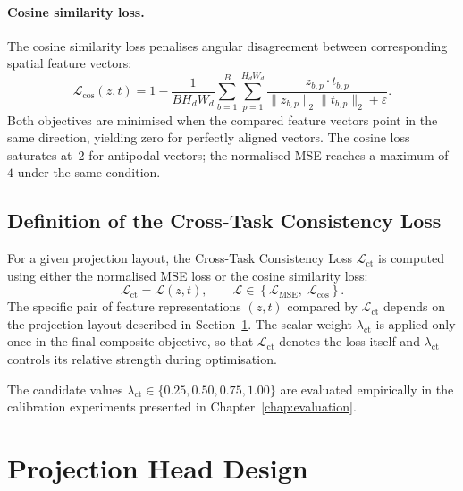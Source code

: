 \paragraph{Cosine similarity loss.}
The cosine similarity loss penalises angular disagreement between
corresponding spatial feature vectors:
\begin{equation}
    \mathcal{L}_\text{cos}(z,t)
    =
    1
    -
    \frac{1}{B H_d W_d}
    \sum_{b=1}^{B}
    \sum_{p=1}^{H_d W_d}
    \frac{
        z_{b,p} \cdot t_{b,p}
    }{
        \|z_{b,p}\|_2 \|t_{b,p}\|_2 + \varepsilon
    }.
    \label{eq:lct-cos}
\end{equation}
Both objectives are minimised when the compared feature vectors point in
the same direction, yielding zero for perfectly aligned vectors. The cosine
loss saturates at~$2$ for antipodal vectors; the normalised MSE reaches a
maximum of~$4$ under the same condition.

\subsection{Definition of the Cross-Task Consistency Loss}
\label{sec:lct-def}

For a given projection layout, the Cross-Task Consistency Loss
$\mathcal{L}_\text{ct}$ is computed using either the normalised MSE loss
or the cosine similarity loss:
\begin{equation}
    \mathcal{L}_\text{ct}
    =
    \mathcal{L}(z,t),
    \qquad
    \mathcal{L}
    \in
    \left\{
    \mathcal{L}_\text{MSE},\;
    \mathcal{L}_\text{cos}
    \right\}.
    \label{eq:lct}
\end{equation}
The specific pair of feature representations $(z,t)$ compared by
$\mathcal{L}_\text{ct}$ depends on the projection layout described in
Section~\ref{sec:projection-design}. The scalar weight
$\lambda_\text{ct}$ is applied only once in the final composite objective,
so that $\mathcal{L}_\text{ct}$ denotes the loss itself and
$\lambda_\text{ct}$ controls its relative strength during optimisation.

The candidate values
$\lambda_\text{ct} \in \{0.25, 0.50, 0.75, 1.00\}$ are evaluated
empirically in the calibration experiments presented in
Chapter~\ref{chap:evaluation}.

\section{Projection Head Design}
\label{sec:projection-design}

